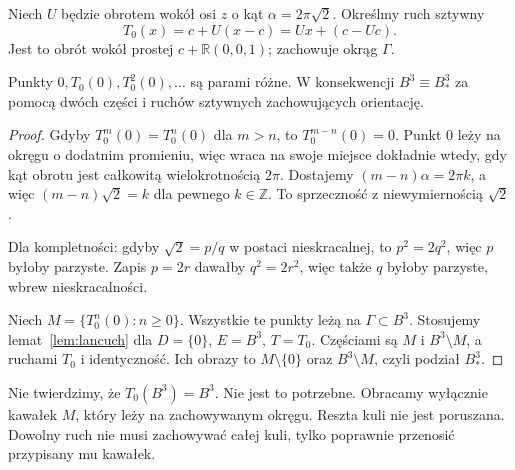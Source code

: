 Niech $U$ będzie obrotem wokół osi $z$ o kąt $\alpha=2\pi\sqrt2$. Określmy ruch sztywny
\begin{equation}\label{eq:8-1}
 T_0(x)=c+U(x-c)=Ux+(c-Uc).
\end{equation}
Jest to obrót wokół prostej $c+\mathbb R(0,0,1)$; zachowuje okrąg $\Gamma$.
\begin{lemat}\label{lem:wchloniecie-srodka}
Punkty $0,T_0(0),T_0^2(0),\ldots$ są parami różne. W konsekwencji $B^3\equiv B^3_*$ za pomocą dwóch części i ruchów sztywnych zachowujących orientację.
\end{lemat}
\begin{proof}
Gdyby $T_0^m(0)=T_0^n(0)$ dla $m>n$, to $T_0^{m-n}(0)=0$. Punkt $0$ leży na okręgu o dodatnim promieniu, więc wraca na swoje miejsce dokładnie wtedy, gdy kąt obrotu jest całkowitą wielokrotnością $2\pi$. Dostajemy $(m-n)\alpha=2\pi k$, a więc $(m-n)\sqrt2=k$ dla pewnego $k\in\mathbb Z$. To sprzeczność z niewymiernością $\sqrt2$.

Dla kompletności: gdyby $\sqrt2=p/q$ w postaci nieskracalnej, to $p^2=2q^2$, więc $p$ byłoby parzyste. Zapis $p=2r$ dawałby $q^2=2r^2$, więc także $q$ byłoby parzyste, wbrew nieskracalności.

Niech $M=\{T_0^n(0):n\ge0\}$. Wszystkie te punkty leżą na $\Gamma\subset B^3$. Stosujemy lemat~\ref{lem:lancuch} dla $D=\{0\}$, $E=B^3$, $T=T_0$. Częściami są $M$ i $B^3\setminus M$, a ruchami $T_0$ i identyczność. Ich obrazy to $M\setminus\{0\}$ oraz $B^3\setminus M$, czyli podział $B^3_*$.
\end{proof}
\begin{uwaga}
Nie twierdzimy, że $T_0(B^3)=B^3$. Nie jest to potrzebne. Obracamy wyłącznie kawałek $M$, który leży na zachowywanym okręgu. Reszta kuli nie jest poruszana. Dowolny ruch nie musi zachowywać całej kuli, tylko poprawnie przenosić przypisany mu kawałek.
\end{uwaga}

